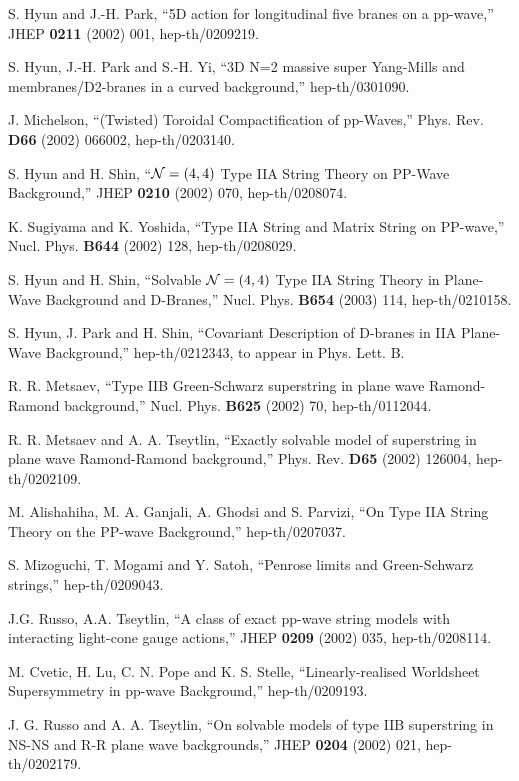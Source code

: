 \documentclass[a4paper,12pt]{article}
\numberwithin{equation}{section}
\begin{document}
\begin{thebibliography}{99}
 S. Hyun and J.-H. Park, ``5D action for longitudinal
  five branes on a pp-wave,'' JHEP {\bf 0211} (2002) 001,
  hep-th/0209219.

 S. Hyun, J.-H. Park and S.-H. Yi, ``3D N=2 massive
  super Yang-Mills and membranes/D2-branes in a curved background,''
  hep-th/0301090.

 J. Michelson, ``(Twisted) Toroidal Compactification
  of pp-Waves,'' Phys. Rev. {\bf D66} (2002) 066002, hep-th/0203140.

 S. Hyun and H. Shin, ``${\cal N}=(4,4)$ Type IIA
  String Theory on PP-Wave Background,'' JHEP {\bf 0210} (2002) 070,
  hep-th/0208074.

 K. Sugiyama and K. Yoshida, ``Type IIA String and
  Matrix String on PP-wave,'' Nucl. Phys. {\bf B644} (2002) 128,
  hep-th/0208029.

 S. Hyun and H. Shin, ``Solvable ${\cal N}=(4,4)$ Type
  IIA String Theory in Plane-Wave Background and D-Branes,'' Nucl.
  Phys.  {\bf B654} (2003) 114, hep-th/0210158.

 S. Hyun, J. Park and H. Shin, ``Covariant Description
  of D-branes in IIA Plane-Wave Background,'' hep-th/0212343, to
  appear in Phys. Lett. B.

 R. R. Metsaev, ``Type IIB Green-Schwarz superstring
  in plane wave Ramond-Ramond background,'' Nucl. Phys.  {\bf B625}
  (2002) 70, hep-th/0112044.

 R. R. Metsaev and A. A. Tseytlin, ``Exactly solvable
  model of superstring in plane wave Ramond-Ramond background,'' Phys.
  Rev. {\bf D65} (2002) 126004, hep-th/0202109.

 M. Alishahiha, M. A. Ganjali, A. Ghodsi and S.
  Parvizi, ``On Type IIA String Theory on the PP-wave Background,''
  hep-th/0207037.

 S. Mizoguchi, T. Mogami and Y. Satoh, ``Penrose
  limits and Green-Schwarz strings,'' hep-th/0209043.

 J.G. Russo, A.A. Tseytlin, ``A class of exact pp-wave
  string models with interacting light-cone gauge actions,'' JHEP {\bf
    0209} (2002) 035, hep-th/0208114.

 M. Cvetic, H. Lu, C. N. Pope and K. S. Stelle,
  ``Linearly-realised Worldsheet Supersymmetry in pp-wave
  Background,'' hep-th/0209193.

 J. G. Russo and A. A. Tseytlin, ``On solvable models
  of type IIB superstring in NS-NS and R-R plane wave backgrounds,''
  JHEP {\bf 0204} (2002) 021, hep-th/0202179.


\end{thebibliography}
\end{document}
